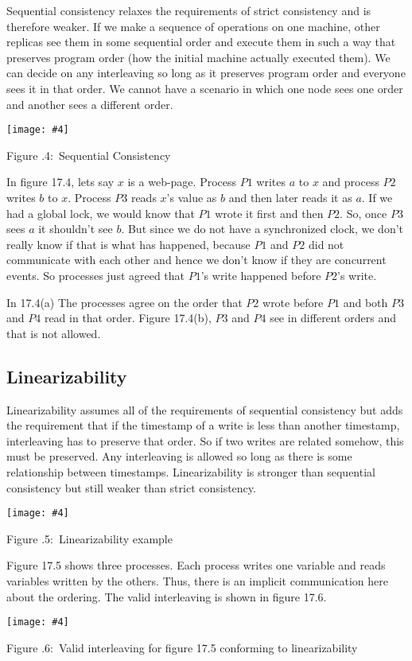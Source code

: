 \documentclass[twoside]{article}
\newcounter{lecnum}
\newcommand{\fig}[4]{
            \centerline{\texttt{[image: \#4]}}
            \begin{center}
            Figure \thelecnum.#1:~#3
            \end{center}
    }
\begin{document}
Sequential consistency relaxes the requirements of strict consistency and is therefore weaker. If we make a sequence of operations on one machine, other replicas see them in some sequential order and execute them in such a way that preserves program order (how the initial machine actually executed them). We can decide on any interleaving so long as it preserves program order and everyone sees it in that order. We cannot have a scenario in which one node sees one order and another sees a different order.

\fig{4}{0.4}{Sequential Consistency}{sequential}

In figure 17.4, lets say $x$ is a web-page. Process $P1$ writes $a$ to $x$ and process $P2$ writes $b$ to $x$. Process $P3$ reads $x$'s value as $b$ and then later reads it as $a$. If we had a global lock, we would know that $P1$ wrote it first and then $P2$. So, once $P3$ sees $a$ it shouldn't see $b$. But since we do not have a synchronized clock, we don't really know if that is what has happened, because $P1$ and $P2$ did not communicate with each other and hence we don't know if they are concurrent events. So processes just agreed that $P1$'s write happened before $P2$'s write. 

In 17.4(a) The processes agree on the order that $P2$ wrote before $P1$ and both $P3$ and $P4$ read in that order. Figure 17.4(b), $P3$ and $P4$ see in different orders and that is not allowed.

\subsection{Linearizability}

Linearizability assumes all of the requirements of sequential consistency but adds the requirement that if the timestamp of a write is less than another timestamp, interleaving has to preserve that order. So if two writes are related somehow, this must be preserved. Any interleaving is allowed so long as there is some relationship between timestamps. Linearizability is stronger than sequential consistency but still weaker than strict consistency.

\fig{5}{0.3}{Linearizability example}{lin_eg}

Figure 17.5 shows three processes. Each process writes one variable and reads variables written by the others. Thus, there is an implicit communication here about the ordering. The valid interleaving is shown in figure 17.6.

\fig{6}{0.3}{Valid interleaving for figure 17.5 conforming to linearizability}{lin_eg_2}
\end{document}
